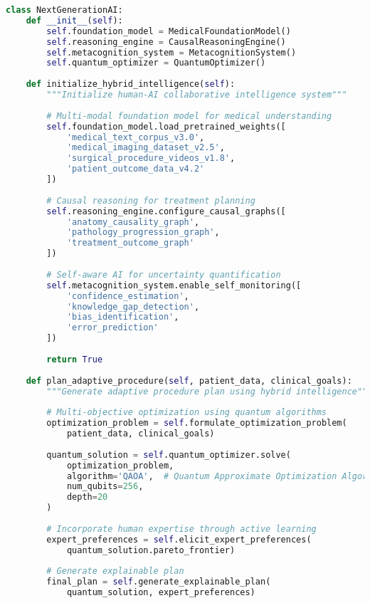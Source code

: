 \begin{lstlisting}[language=Python, caption={Next-Generation AI Architecture}, label={lst:nextgen-ai}]
class NextGenerationAI:
    def __init__(self):
        self.foundation_model = MedicalFoundationModel()
        self.reasoning_engine = CausalReasoningEngine()
        self.metacognition_system = MetacognitionSystem()
        self.quantum_optimizer = QuantumOptimizer()
        
    def initialize_hybrid_intelligence(self):
        """Initialize human-AI collaborative intelligence system"""
        
        # Multi-modal foundation model for medical understanding
        self.foundation_model.load_pretrained_weights([
            'medical_text_corpus_v3.0',
            'medical_imaging_dataset_v2.5',
            'surgical_procedure_videos_v1.8',
            'patient_outcome_data_v4.2'
        ])
        
        # Causal reasoning for treatment planning
        self.reasoning_engine.configure_causal_graphs([
            'anatomy_causality_graph',
            'pathology_progression_graph',
            'treatment_outcome_graph'
        ])
        
        # Self-aware AI for uncertainty quantification
        self.metacognition_system.enable_self_monitoring([
            'confidence_estimation',
            'knowledge_gap_detection',
            'bias_identification',
            'error_prediction'
        ])
        
        return True
    
    def plan_adaptive_procedure(self, patient_data, clinical_goals):
        """Generate adaptive procedure plan using hybrid intelligence"""
        
        # Multi-objective optimization using quantum algorithms
        optimization_problem = self.formulate_optimization_problem(
            patient_data, clinical_goals)
        
        quantum_solution = self.quantum_optimizer.solve(
            optimization_problem,
            algorithm='QAOA',  # Quantum Approximate Optimization Algorithm
            num_qubits=256,
            depth=20
        )
        
        # Incorporate human expertise through active learning
        expert_preferences = self.elicit_expert_preferences(
            quantum_solution.pareto_frontier)
        
        # Generate explainable plan
        final_plan = self.generate_explainable_plan(
            quantum_solution, expert_preferences)
        

\end{lstlisting}
